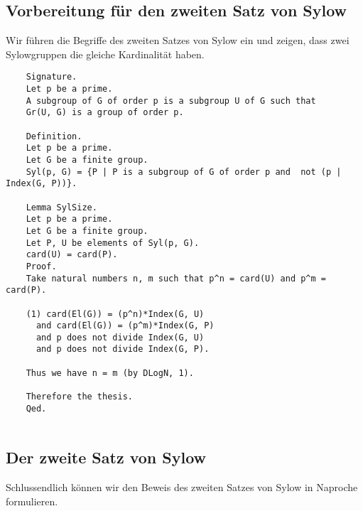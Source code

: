 \documentclass[a4paper,12pt]{scrartcl}
\begin{document}
\subsection{Vorbereitung für den zweiten Satz von Sylow}

Wir führen die Begriffe des zweiten Satzes von Sylow ein und zeigen, dass zwei Sylowgruppen die gleiche Kardinalität haben.

\begin{lstlisting}
	Signature.
	Let p be a prime.
	A subgroup of G of order p is a subgroup U of G such that
	Gr(U, G) is a group of order p.
	
	Definition.
	Let p be a prime.
	Let G be a finite group.
	Syl(p, G) = {P | P is a subgroup of G of order p and  not (p | Index(G, P))}.
	
	Lemma SylSize.
	Let p be a prime.
	Let G be a finite group.
	Let P, U be elements of Syl(p, G).
	card(U) = card(P).
	Proof.
	Take natural numbers n, m such that p^n = card(U) and p^m = card(P).
	
	(1) card(El(G)) = (p^n)*Index(G, U) 
	  and card(El(G)) = (p^m)*Index(G, P) 
	  and p does not divide Index(G, U)
	  and p does not divide Index(G, P).
	
	Thus we have n = m (by DLogN, 1).
	
	Therefore the thesis.
	Qed.
	
\end{lstlisting}

\subsection{Der zweite Satz von Sylow}

Schlussendlich können wir den Beweis des zweiten Satzes von Sylow in Naproche formulieren.
\end{document}
